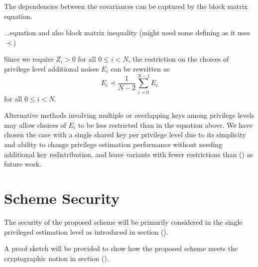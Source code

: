 \documentclass[conference]{IEEEtran}
\theoremstyle{definition}
\theoremstyle{definition}
\theoremstyle{remark}
\begin{document}
The dependencies between the covariances can be captured by the block matrix equation.

...equation and also block matrix inequality (might need some defining as it uses $\prec$)

Since we require $Z_i>0$ for all $0 \leq i < N$, the restriction on the choices of privilege level additional noises $E_i$ can be rewritten as
\begin{equation}
   E_i \prec \frac{1}{N-2}\sum_{i=0}^{N-1}E_i
\end{equation}
for all $0 \leq i < N$.

Alternative methods involving multiple or overlapping keys among privilege levels may allow choices of $E_i$ to be less restricted than in the equation above. We have chosen the case with a single shared key per privilege level due to its simplicity and ability to change privilege estimation performance without needing additional key redistribution, and leave variants with fewer restrictions than () as future work.

% 
%                                                                                        
%                                                                                        
%                                                                                        
% 

\section{Scheme Security}\label{sec:security}
The security of the proposed scheme will be primarily considered in the single privileged estimation level as introduced in section ().

A proof sketch will be provided to show how the proposed scheme meets the cryptographic notion in section ().
\end{document}
